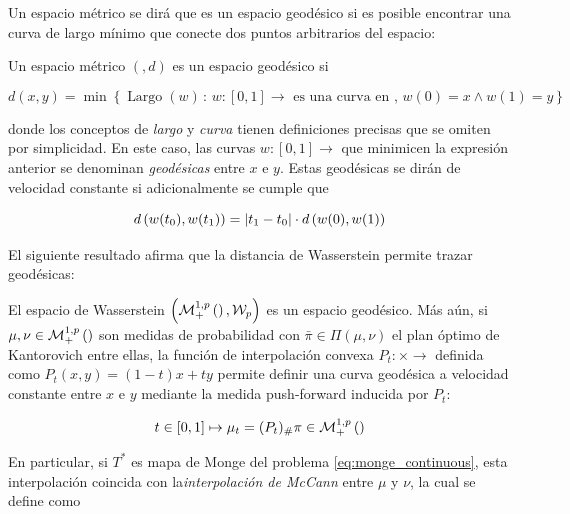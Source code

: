 Un espacio métrico se dirá que es un espacio geodésico si es posible encontrar una curva de largo mínimo que conecte dos puntos arbitrarios del espacio:

\begin{defn}
	Un espacio métrico $(\xspace,d)$ es un espacio geodésico si

	\begin{equation*}
		d(x,y) = \min \left\{\operatorname{Largo}(w)\,:\, w:[0,1]\to\xspace\text{ es una curva en }\xspace,\, w(0)=x \wedge w(1)=y\right\}
	\end{equation*}

	donde los conceptos de \textit{largo} y \textit{curva} tienen definiciones precisas que se omiten por simplicidad. En este caso, las curvas $w:[0,1]\to\xspace$ que minimicen la expresión anterior se denominan \textit{geodésicas} entre $x$ e $y$. Estas geodésicas se dirán de velocidad constante si adicionalmente se cumple que

	\begin{equation*}
		d\left(w(t_0),w(t_1)\right) = |t_1-t_0| \cdot d\left(w(0),w(1)\right)
	\end{equation*}
\end{defn}

El siguiente resultado afirma que la distancia de Wasserstein permite trazar geodésicas:

\begin{teo}[$\probmeasurep{\xspace}$ es un espacio geodésico]
	\label{teo:wasserstein_geodesic}
	El espacio de Wasserstein $\left(\mathcal{M}_+^{1,p}\left(\right), \mathcal{W}_p\right)$ es un espacio geodésico. Más aún, si $\mu,\nu\in\mathcal{M}_+^{1,p}\left(\right)$ son medidas de probabilidad con $\bar\pi\in\Pi(\mu,\nu)$ el plan óptimo de Kantorovich entre ellas, la función de interpolación convexa $P_t:\xspace\times\xspace\to\xspace$ definida como $P_t(x,y) = (1-t)x + ty$ permite definir una curva geodésica a velocidad constante entre $x$ e $y$ mediante la medida push-forward inducida por $P_t$:

	\begin{equation*}
		t\in[0,1] \mapsto \mu_t = (P_t)_\#\pi \in\mathcal{M}_+^{1,p}\left(\right)
	\end{equation*}
\end{teo}

En particular, si $T^*$ es mapa de Monge del problema \eqref{eq:monge_continuous}, esta interpolación coincida con la\textit{interpolación de McCann} entre $\mu$ y $\nu$, la cual se define como

